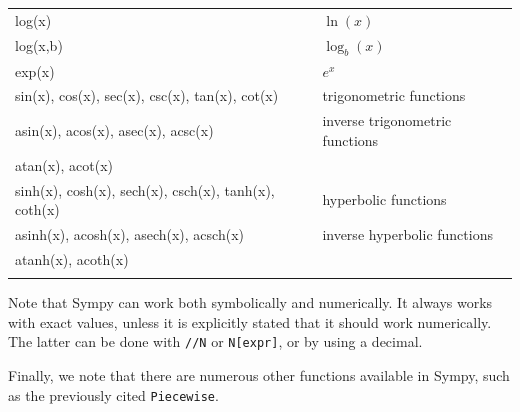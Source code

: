\begin{tabular}{>{\hfill}m{9cm}p{8cm}}
	log(x)			&	$\ln(x)$\\
	log(x,b)		&	$\log_b(x)$\\
	exp(x)			&	$e^x$\\
	sin(x), cos(x), sec(x),  csc(x), tan(x), cot(x)							&	trigonometric functions\\
	asin(x),  acos(x), asec(x),  acsc(x)		&	inverse trigonometric functions \\
	atan(x), acot(x)			&	\\
	\ifanalysis
	sinh(x),  cosh(x), sech(x),  csch(x), tanh(x), coth(x)						&	hyperbolic functions \\
	asinh(x),  acosh(x), asech(x),  acsch(x)	&	inverse hyperbolic functions\\
	atanh(x), acoth(x)	&	\\\fi
	\multicolumn{2}{l}{}
\end{tabular}

Note that Sympy can work both symbolically and numerically. It always works with exact values, unless it is explicitly stated that it should work numerically. The latter can be done with \lstinline{//N} or \lstinline{N[expr]},  or by using a decimal.

Finally, we note that there are numerous other functions available in Sympy, such as the previously cited \lstinline|Piecewise|.


